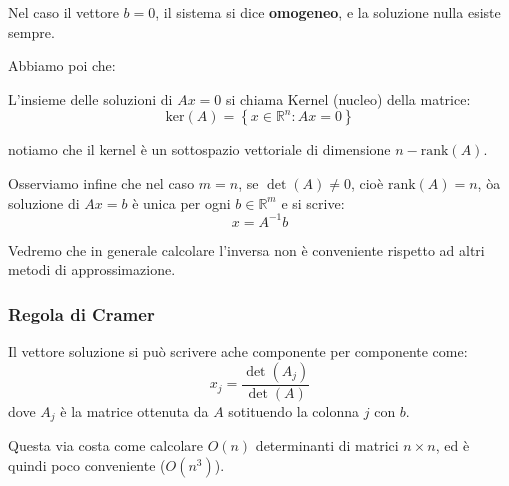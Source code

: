 \documentclass[a4paper,11pt]{article}
\begin{document}
Nel caso il vettore $b = 0$, il sistema si dice \textbf{omogeneo}, e la soluzione nulla esiste sempre.

Abbiamo poi che:
\begin{definition}{}
	L'insieme delle soluzioni di $Ax = 0$ si chiama Kernel (nucleo) della matrice:
	$$
		\mathrm{ker}(A) = \left\{ x \in \mathbb{R}^n : Ax = 0 \right\}
	$$
\end{definition}
notiamo che il kernel è un sottospazio vettoriale di dimensione $n - \mathrm{rank}(A)$.

Osserviamo infine che nel caso $m = n$, se $\det(A) \neq 0$, cioè $\mathrm{rank}(A) = n$, òa soluzione di $Ax = b$ è unica per ogni $b \in \mathbb{R}^m$ e si scrive:
$$
x = A^{-1} b
$$

Vedremo che in generale calcolare l'inversa non è conveniente rispetto ad altri metodi di approssimazione.

\subsubsection{Regola di Cramer}
Il vettore soluzione si può scrivere ache componente per componente come:
$$
x_j = \frac{\det(A_j)}{\det(A)}
$$
dove $A_j$ è la matrice ottenuta da $A$ sotituendo la colonna $j$ con $b$.

Questa via costa come calcolare $O(n)$ determinanti di matrici $n \times n$, ed è quindi poco conveniente ($O(n^3)$). 
\end{document}
